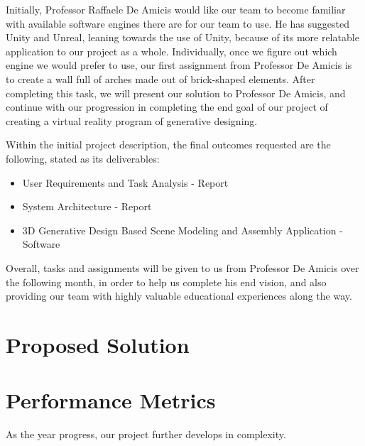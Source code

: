 \documentclass[letterpaper,10pt,onecolumn]{IEEEtran}
\begin{document}
\noindent
Initially, Professor Raffaele De Amicis would like our team to become familiar with available software engines there are for our team to use. He has suggested Unity and Unreal, leaning towards the use of Unity, because of its more relatable application to our project as a whole. Individually, once we figure out which engine we would prefer to use, our first assignment from Professor De Amicis is to create a wall full of arches made out of brick-shaped elements. After completing this task, we will present our solution to Professor De Amicis, and continue with our progression in completing the end goal of our project of creating a virtual reality program of generative designing.

\noindent
Within the initial project description, the final outcomes requested are the following, stated as its deliverables:

\begin{itemize}
	\item User Requirements and Task Analysis - Report
	\item System Architecture - Report
	\item 3D Generative Design Based Scene Modeling and Assembly Application - Software
\end{itemize}

\noindent
Overall, tasks and assignments will be given to us from Professor De Amicis over the following month, in order to help us complete his end vision, and also providing our team with highly valuable educational experiences along the way. 

\section{\textbf{Proposed Solution}}

\iffalse
\noindent
We will first create some basic algorithms that translates an object in to complex shapes, than move onto more complex algorithms. We will use an API or library in Unity for a robot application.
\fi



\section{\textbf{Performance Metrics}}

\iffalse
\noindent
Tell how will know when we completed the project
\par \noindent
Metrics help you and your client agree on what is successful completion of what the project looks like (e.g., faster, cheaper, easier to use, "a working prototype," a complete white paper with research results).
\fi

\noindent
As the year progress, our project further develops in complexity.

\end{document}
